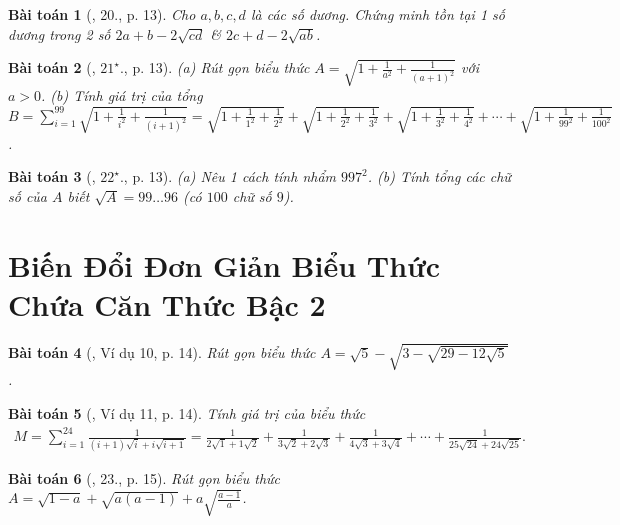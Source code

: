 \documentclass{article}
\newtheorem{baitoan}{Bài toán}
\begin{document}
\begin{baitoan}[\cite{Binh_Toan_9_tap_1}, 20., p. 13]
	Cho $a,b,c,d$ là các số dương. Chứng minh tồn tại 1 số dương trong 2 số $2a + b - 2\sqrt{cd}$ \& $2c + d - 2\sqrt{ab}$.
\end{baitoan}

\begin{baitoan}[\cite{Binh_Toan_9_tap_1}, $21^\star$., p. 13]
	(a) Rút gọn biểu thức $A = \sqrt{1 + \frac{1}{a^2} + \frac{1}{(a + 1)^2}}$ với $a > 0$. (b) Tính giá trị của tổng $B = \sum_{i=1}^{99} \sqrt{1 + \frac{1}{i^2} + \frac{1}{(i + 1)^2}} = \sqrt{1 + \frac{1}{1^2} + \frac{1}{2^2}} + \sqrt{1 + \frac{1}{2^2} + \frac{1}{3^2}} + \sqrt{1 + \frac{1}{3^2} + \frac{1}{4^2}} + \cdots + \sqrt{1 + \frac{1}{99^2} + \frac{1}{100^2}}$.
\end{baitoan}

\begin{baitoan}[\cite{Binh_Toan_9_tap_1}, $22^\star$., p. 13]
	(a) Nêu 1 cách tính nhẩm $997^2$. (b) Tính tổng các chữ số của $A$ biết $\sqrt{A} = 99\ldots96$ (có $100$ chữ số $9$).
\end{baitoan}


\section{Biến Đổi Đơn Giản Biểu Thức Chứa Căn Thức Bậc 2}

\begin{baitoan}[\cite{Binh_Toan_9_tap_1}, Ví dụ 10, p. 14]
	Rút gọn biểu thức $A = \sqrt{5} - \sqrt{3 - \sqrt{29 - 12\sqrt{5}}}$.
\end{baitoan}

\begin{baitoan}[\cite{Binh_Toan_9_tap_1}, Ví dụ 11, p. 14]
	Tính giá trị của biểu thức
	\begin{align*}
		M = \sum_{i=1}^{24} \frac{1}{(i + 1)\sqrt{i} + i\sqrt{i + 1}} = \frac{1}{2\sqrt{1} + 1\sqrt{2}} + \frac{1}{3\sqrt{2} + 2\sqrt{3}} + \frac{1}{4\sqrt{3} + 3\sqrt{4}} + \cdots + \frac{1}{25\sqrt{24} + 24\sqrt{25}}.
	\end{align*}
\end{baitoan}

\begin{baitoan}[\cite{Binh_Toan_9_tap_1}, 23., p. 15]
	Rút gọn biểu thức $A = \sqrt{1 - a} + \sqrt{a(a - 1)} + a\sqrt{\frac{a - 1}{a}}$.
\end{baitoan}
\end{document}
